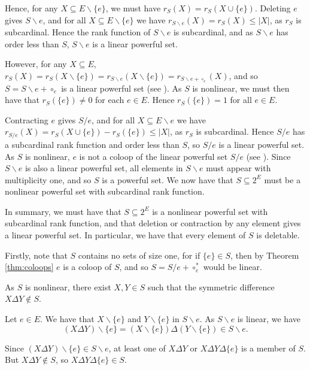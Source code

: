 \documentclass[10pt]{article}
\theoremstyle{definition}
\begin{document}
	Hence, for any $X\subseteq E\backslash \{e\}$, we must have $r_S(X)=r_S(X\cup \{e\})$. Deleting $e$ gives $S\backslash e$, and for all $X\subseteq E\backslash \{e\}$ we have $r_{S\backslash e}(X)=r_S(X)\leq |X|$, as $r_S$ is subcardinal. Hence the rank function of  $S\backslash{e}$ is subcardinal, and as $S\backslash{e}$ has order less than $S$, $S\backslash e$ is a linear powerful set. 

	However, for any $X\subseteq E$, $r_S(X)=r_S(X\backslash\{e\})=r_{S\backslash e}(X\backslash\{e\})=r_{S\backslash e+\circ_e}(X)$, and so $S=S\backslash{e}+\circ_e$ is a linear powerful set (see \cite{farr2017}). As $S$ is nonlinear, we must then have that $r_S(\{e\})\neq 0$ for each $e\in E$. Hence $r_S(\{e\})=1$ for all $e\in E$.
	
	Contracting $e$ gives $S/e$, and for all $X\subseteq E\backslash e$ we have $r_{S/e}(X)=r_S(X\cup \{e\})-r_S(\{e\})\leq |X|$, as $r_S$ is subcardinal. Hence  $S/{e}$ has a subcardinal rank function and order less than $S$, so $S/e$ is a linear powerful set. As $S$ is nonlinear, $e$ is not a coloop of the linear powerful set $S/e$ (see \cite{farr2017}). 
	Since $S\backslash e$ is also a linear powerful set, all elements in $S\backslash e$ must appear with multiplicity one, and so $S$ is a powerful set. We now have that $S\subseteq 2^E$ must be a nonlinear powerful set with subcardinal rank function.
	
    In summary, we must have that $S\subseteq 2^E$ is a nonlinear powerful set with subcardinal rank function, and that deletion or contraction by any element gives a linear powerful set. In particular, we have that every element of $S$ is deletable. 
	
	Firstly, note that $S$ contains no sets of size one, for if $\{e\}\in S$, then by Theorem \ref{thm:coloops} $e$ is a coloop of $S$, and so $S=S/e+\circ^*_e$ would be linear. 
	
	As $S$ is nonlinear, there exist $X,Y\in S$ such that the symmetric difference $X\Delta Y\notin S$. 
	
	
	Let $e\in E$. We have that $X\backslash\{e\}$ and $Y\backslash\{e\}$ in $S\backslash e$. As $S\backslash{ e}$ is linear, we have 
	\[(X\Delta Y)\backslash \{e\}=	(X\backslash \{e\}) \Delta (Y\backslash \{e\})  \in S\backslash e.	\]
	
Since $(X\Delta Y)\backslash \{e\} \in S\backslash e$, at least one of $X\Delta Y$ or $X\Delta Y\Delta \{e\}$ is a member of $S$. But $X\Delta Y \notin S$, so $X\Delta Y \Delta \{e\}\in S$.
	
\end{document}
